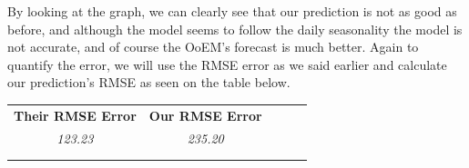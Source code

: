 By looking at the graph, we can clearly see that our prediction is not as good as before, and although the model seems to follow the daily seasonality the model is not accurate, and of course the OoEM's forecast is much better. Again to quantify the error, we will use the RMSE error as we said earlier and calculate our prediction's RMSE as seen on the table below.
\begin{table}[ht!]
\centering
\begin{tabular}{lllll}
\cline{1-2}
\multicolumn{1}{|l|}{\textbf{Their RMSE Error}} & \multicolumn{1}{l|}{\textbf{Our RMSE Error}} &  &  &  \\ \cline{1-2}
\multicolumn{1}{|c|}{\textit{123.23}} & \multicolumn{1}{c|}{\textit{235.20}} &  &  &  \\ \cline{1-2}
                                &                                &  &  &  \\
                                &                                &  &  & 
\end{tabular}
\end{table}
\newpage
